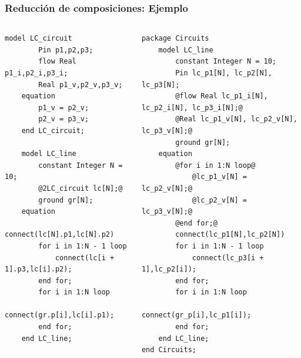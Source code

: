 \begin{frame}[fragile]
\frametitle{Reducción de composiciones: Ejemplo}
\begin{columns} 
\column[t]{7cm}  
\begin{lstlisting}[style=base,basicstyle=\scriptsize]
    model LC_circuit
        Pin p1,p2,p3;
        flow Real p1_i,p2_i,p3_i;
        Real p1_v,p2_v,p3_v;
    equation
        p1_v = p2_v;
        p2_v = p3_v;
    end LC_circuit;
    
    model LC_line
        constant Integer N = 10;
        @2LC_circuit lc[N];@
        ground gr[N];
    equation
        connect(lc[N].p1,lc[N].p2)      
        for i in 1:N - 1 loop
            connect(lc[i + 1].p3,lc[i].p2);
        end for;
        for i in 1:N loop
            connect(gr.p[i],lc[i].p1);
        end for;
    end LC_line;
\end{lstlisting}
\pause
\column[t]{8cm}  
\begin{lstlisting}[style=base,basicstyle=\scriptsize]
package Circuits
    model LC_line
        constant Integer N = 10;
        Pin lc_p1[N], lc_p2[N], lc_p3[N];
        @flow Real lc_p1_i[N], lc_p2_i[N], lc_p3_i[N];@
        @Real lc_p1_v[N], lc_p2_v[N], lc_p3_v[N];@
        ground gr[N];
    equation
        @for i in 1:N loop@
            @lc_p1_v[N] = lc_p2_v[N];@
            @lc_p2_v[N] = lc_p3_v[N];@
        @end for;@
        connect(lc_p1[N],lc_p2[N])      
        for i in 1:N - 1 loop
            connect(lc_p3[i + 1],lc_p2[i]);
        end for;
        for i in 1:N loop
            connect(gr_p[i],lc_p1[i]);
        end for;
    end LC_line;
end Circuits;
\end{lstlisting}
\end{columns}
\end{frame}
